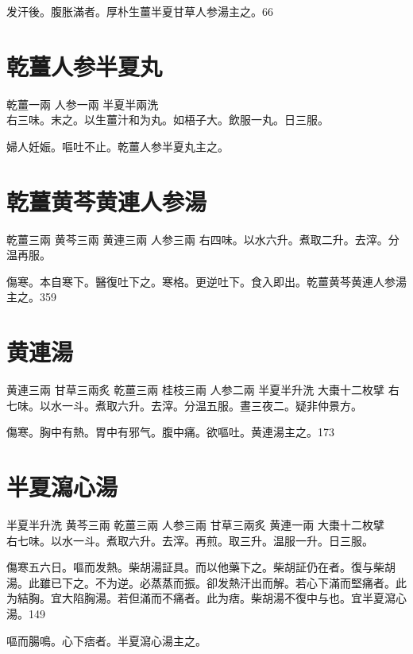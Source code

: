 发汗後。腹胀滿者。厚朴{\khaaitp 生薑半夏甘草人参}湯主之。66

\section{乾薑人参半夏丸}

乾薑{\scriptsize 一兩} 人参{\scriptsize 一兩} 半夏{\scriptsize 半兩洗}\\
右三味。末之。以生薑汁和为丸。如梧子大。飲服一丸。日三服。

{\khaaitp 婦人}妊娠。嘔吐不止。乾薑人参半夏丸主之。

\section{乾薑黄芩黄連人参湯}

乾薑{\scriptsize 三兩} 黄芩{\scriptsize 三兩} 黄連{\scriptsize 三兩} 人参{\scriptsize 三兩}
右四味。以水六升。煮取二升。去滓。分温再服。

傷寒。本自寒下。醫復吐{\khaaitp 下}之。寒格。更逆吐{\khaaitp 下}。食入即出。乾薑黄芩黄連人参湯主之。359

\section{黄連湯}

黄連{\scriptsize 三兩} 甘草{\scriptsize 三兩炙} 乾薑{\scriptsize 三兩} 桂枝{\scriptsize 三兩} 人参{\scriptsize 二兩} 半夏{\scriptsize 半升洗} 大棗{\scriptsize 十二枚擘}
右七味。以水一斗。煮取六升。去滓。分温五服。晝三夜二。疑非仲景方。

傷寒。胸中有熱。胃中有邪气。腹中痛。欲嘔吐。黄連湯主之。173

\section{半夏瀉心湯}

半夏{\scriptsize 半升洗} 黄芩{\scriptsize 三兩} 乾薑{\scriptsize 三兩} 人参{\scriptsize 三兩} 甘草{\scriptsize 三兩炙} 黄連{\scriptsize 一兩} 大棗{\scriptsize 十二枚擘}\\
右七味。以水一斗。煮取六升。去滓。再煎。取三升。温服一升。日三服。

傷寒五六日。嘔而发熱。柴胡湯証具。而以他藥下之。柴胡証仍在者。復与柴胡湯。此雖已下之。不为逆。必蒸蒸而振。卻发熱汗出而解。若心下滿而堅痛者。此为結胸。宜大陷胸湯。若但滿而不痛者。此为痞。柴胡{\khaaitp 湯}不復中与也。宜半夏瀉心湯。149

嘔而腸鳴。心下痞者。半夏瀉心湯主之。

